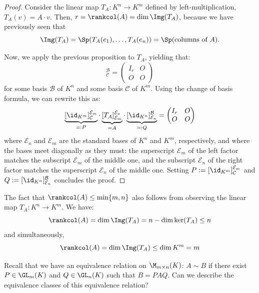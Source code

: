 \begin{proof}
Consider the linear map $T_A: K^n \to K^m$ defined by left-multiplication, $T_A(v) = A \cdot v$. Then, $r = \rankcol(A) = \dim \Img(T_A)$, because we have previously seen that 
\[\Img(T_A) = \Sp(T_A(e_1), \dots, T_A(e_n)) = \Sp(\text{columns of } A).\]

Now, we apply the previous proposition to $T_A$, yielding that:
\begin{equation*}
    [T_A]_{\mathcal{C}}^{\mathcal{B}} = \begin{pmatrix} I_r & O \\ O & O \end{pmatrix}
\end{equation*}
for some basis $\mathcal{B}$ of $K^n$ and some basis $\mathcal{C}$ of $K^m$. Using the change of basis formula, we can rewrite this as:
\begin{equation*}
    \underbrace{[\id_{K^m}]_{\mathcal{C}}^{\mathcal{E}_m}}_{=: P} \cdot \underbrace{[T_A]_{\mathcal{E}_m}^{\mathcal{E}_n}}_{= A} \cdot \underbrace{[\id_{K^n}]_{\mathcal{E}_n}^{\mathcal{B}}}_{=: Q} = \begin{pmatrix} I_r & O \\ O & O \end{pmatrix}
\end{equation*}
where $\mathcal{E}_n$ and $\mathcal{E}_m$ are the standard bases of $K^n$ and $K^m$, respectively, and where the bases meet diagonally as they must: the superscript $\mathcal{E}_m$ of the left factor matches the subscript $\mathcal{E}_m$ of the middle one, and the subscript $\mathcal{E}_n$ of the right factor matches the superscript $\mathcal{E}_n$ of the middle one. Setting $P := [\id_{K^m}]_{\mathcal{C}}^{\mathcal{E}_m}$ and $Q := [\id_{K^n}]_{\mathcal{E}_n}^{\mathcal{B}}$ concludes the proof.
\end{proof}

\begin{remark}
The fact that $\rankcol(A) \le \min\{m, n\}$ also follows from observing the linear map $T_A: K^n \to K^m$. We have:
\begin{equation*}
    \rankcol(A) = \dim \Img(T_A) = n - \dim \ker(T_A) \le n
\end{equation*}
and simultaneously,
\begin{equation*}
    \rankcol(A) = \dim \Img(T_A) \le \dim K^m = m
\end{equation*}
\end{remark}

\begin{question}
Recall that we have an equivalence relation on $\M_{m \times n}(K)$: $A \sim B$ if there exist $P \in \GL_m(K)$ and $Q \in \GL_n(K)$ such that $B = PAQ$. Can we describe the equivalence classes of this equivalence relation?
\end{question}

